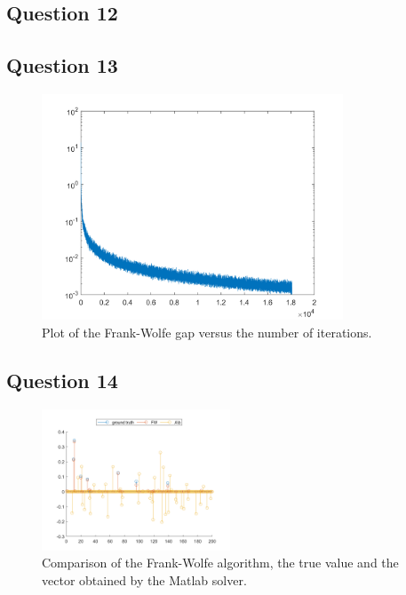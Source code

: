 \documentclass[12p]{article}
\begin{document}
\subsection*{Question 12} 

    
    
\subsection*{Question 13} 


\begin{figure}[h]
    \centering
    \includegraphics[width=0.8\textwidth]{gaps.png}
    \caption{Plot of the Frank-Wolfe gap versus the number of iterations.}
    \label{fig:my_label}
\end{figure}

\subsection*{Question 14} 
\begin{figure}[h]
    \centering
    \includegraphics[width=0.5\textwidth]{compare.png}
    \caption{Comparison of the Frank-Wolfe algorithm, the true value and the vector obtained by the Matlab solver.}
    \label{fig:next}
\end{figure}
\end{document}
